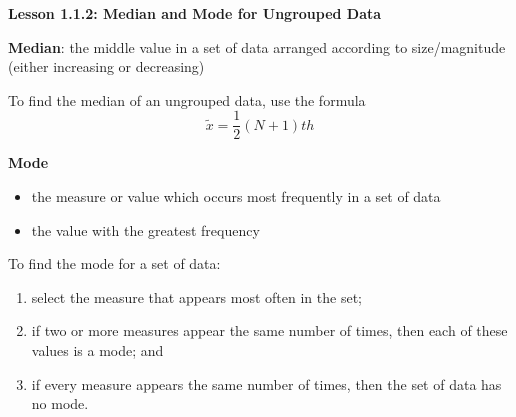 \begin{center}
\textbf{Lesson 1.1.2: Median and Mode for Ungrouped Data}
\end{center}


\textbf{Median}: the middle value in a set of data arranged according to size/magnitude (either increasing or decreasing) 

To find the median of an ungrouped data, use the formula
\vspace*{-1ex}
\[
\tilde{x} = \displaystyle \frac{1}{2}(N+1)th
\] 

\vspace*{-1ex}
\textbf{Mode}
\begin{itemize} 
\item the measure or value which occurs most frequently in a set of data
\item the value with the greatest frequency
\end{itemize}  

To find the mode for a set of data:
\begin{enumerate}[label = \arabic*. ]
\item select the measure that appears most often in the set; 
\item if two or more measures appear the same number of times, then each of these 
values is a mode; and
\item if every measure appears the same number of times, then the set of data has no 
mode.
\end{enumerate}   

